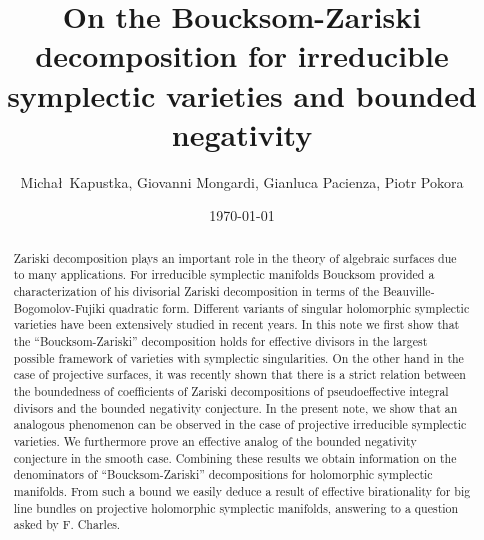 \documentclass[12pt,reqno]{amsart}
\theoremstyle{plain}
\theoremstyle{definition}
\begin{document}
\title{On the Boucksom-Zariski decomposition for irreducible symplectic varieties and bounded negativity}
\author{Micha\l\ Kapustka, Giovanni Mongardi, Gianluca Pacienza, Piotr Pokora}
\date{\today}



\address{Micha\l\ Kapustka \newline
	Institute of Mathematics of the Polish Academy of Sciences,
	ul. \'{S}niadeckich 8,
	00-656 Warszawa, Poland.}

\address{Giovanni Mongardi \newline
	Dipartimento di Matematica, Universit\`a degli studi di Bologna, Piazza Di Porta San Donato 5, Bologna, Italia 40126.}

\address{Gianluca Pacienza \newline
	Institut Elie Cartan de Lorraine, Universit\'e de Lorraine et CNRS, F-54000 Nancy, France.}

\address{Piotr Pokora \newline
Department of Mathematics,
University of the National Education Commission Krakow,
Podchor\c a\.zych 2,
PL-30-084 Krak\'ow, Poland.}



\begin{abstract}
	Zariski decomposition plays an important role in the theory of algebraic surfaces due to many applications. For irreducible symplectic manifolds Boucksom provided a characterization of his divisorial Zariski decomposition in terms
	of the Beauville-Bogomolov-Fujiki quadratic form.  Different variants of singular holomorphic symplectic varieties have been extensively studied in recent years. 
	In this note we first show that the ``Boucksom-Zariski'' decomposition holds for effective divisors in the largest possible framework of varieties with symplectic singularities. 
	On the other hand in the case of projective surfaces, it was recently shown that there is a strict relation between the boundedness of coefficients of Zariski decompositions of pseudoeffective integral divisors and the bounded negativity conjecture. In the present note, we show that an analogous phenomenon can be observed in the case of  projective  irreducible symplectic varieties. We furthermore prove an effective analog of the bounded negativity conjecture in the smooth case. Combining these results we obtain information on the denominators of ``Boucksom-Zariski'' decompositions for holomorphic symplectic manifolds. From such a bound we easily deduce a result of effective birationality for big line bundles on projective holomorphic symplectic manifolds, answering to a question asked by F. Charles.
\end{abstract}
\end{document}
